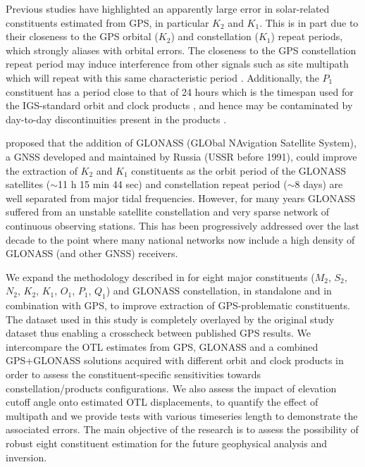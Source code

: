 \documentclass[se, manuscript]{copernicus}
\begin{document}
Previous studies have highlighted an apparently large error in solar-related constituents estimated from GPS, in particular $K_2$ and $K_1$. This is in part due to their closeness to the GPS orbital ($K_2$) and constellation ($K_1$) repeat periods, which strongly aliases with orbital errors. The closeness to the GPS constellation repeat period may induce interference from other signals such as site multipath which will repeat with this same characteristic period \citep{Schenewerk2001,Urschl2005,Thomas2006}. Additionally, the $P_1$ constituent has a period close to that of 24 hours which is the timespan used for the IGS-standard orbit and clock products \citep{Griffiths2009}, and hence may be contaminated by day-to-day discontinuities present in the products \citep{Ito2011}.

\cite{Urschl2005} proposed that the addition of GLONASS (GLObal NAvigation Satellite System), a GNSS developed and maintained by Russia (USSR before 1991), could improve the extraction of $K_2$ and $K_1$ constituents as the orbit period of the GLONASS satellites ($\sim$11 h 15 min 44 sec) and constellation repeat period ($\sim$8 days) are well separated from major tidal frequencies. However, for many years GLONASS suffered from an unstable satellite constellation and very sparse network of continuous observing stations. This has been progressively addressed over the last decade to the point where many national networks now include a high density of GLONASS (and other GNSS) receivers.

We expand the methodology described in \cite{Penna2015} for eight major constituents ($M_2$, $S_2$, $N_2$, $K_2$, $K_1$, $O_1$, $P_1$, $Q_1$) and GLONASS constellation, in standalone and in combination with GPS, to improve extraction of GPS-problematic constituents. The dataset used in this study is completely overlayed by the original study dataset thus enabling a crosscheck between published GPS results. We intercompare the OTL estimates from GPS, GLONASS and a combined GPS+GLONASS solutions acquired with different orbit and clock products in order to assess the constituent-specific sensitivities towards constellation/products configurations. We also assess the impact of elevation cutoff angle onto estimated OTL displacements, to quantify the effect of multipath and we provide tests with various timeseries length to demonstrate the associated errors. The main objective of the research is to assess the possibility of robust eight constituent estimation for the future geophysical analysis and inversion.
\end{document}
